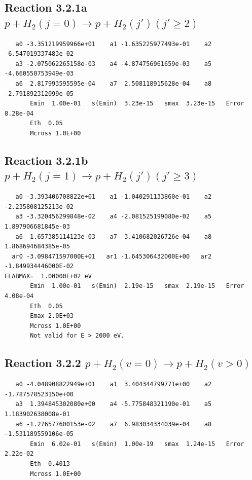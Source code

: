 \documentclass[12pt,dvipdfmx]{article}
\begin{document}
\newpage
\subsection{
Reaction 3.2.1a $   p + H_2(j=0) \rightarrow p + H_2(j')   (j' \geq 2)$}


\begin{small}\begin{verbatim}
   a0 -3.351219959966e+01    a1 -1.635225977493e-01    a2 -6.547019337483e-02
   a3 -2.075062265158e-03    a4 -4.874756961659e-03    a5 -4.660550753949e-03
   a6  2.817993595595e-04    a7  2.508118915628e-04    a8 -2.791892312099e-05
       Emin  1.00e-01   s(Emin)  3.23e-15   smax  3.23e-15   Error  8.28e-04
       Eth  0.05
       Mcross 1.0E+00
\end{verbatim}\end{small}







\newpage
\subsection{
Reaction 3.2.1b $   p + H_2(j=1) \rightarrow p + H_2(j')   (j' \geq 3)$}


\begin{small}\begin{verbatim}
   a0 -3.393406708822e+01    a1 -1.040291133860e-01    a2 -2.235808125213e-02
   a3 -3.320456299848e-02    a4 -2.081525199080e-02    a5  1.897906681845e-03
   a6  1.657385114123e-03    a7 -3.410682026726e-04    a8  1.868694684385e-05
  ar0 -3.098471597000E+01   ar1 -1.645306432000E+00   ar2 -1.849934446000E-02
ELABMAX=  1.00000E+02 eV
       Emin  1.00e-01   s(Emin)  2.19e-15   smax  2.19e-15   Error  4.08e-04
       Eth  0.05
       Emax 2.0E+03
       Mcross 1.0E+00
       Not valid for E > 2000 eV.
\end{verbatim}\end{small}


\newpage
\subsection{
Reaction 3.2.2 $   p + H_2(v=0) \rightarrow p + H_2(v > 0)$}


\begin{small}\begin{verbatim}
   a0 -4.048908822949e+01    a1  3.404344799771e+00    a2 -1.787578523150e+00
   a3  1.394845302080e+00    a4 -5.775848321190e-01    a5  1.183902638008e-01
   a6 -1.276577600153e-02    a7  6.983034334039e-04    a8 -1.531189559106e-05
       Emin  6.02e-01   s(Emin)  1.00e-19   smax  1.24e-15   Error  2.22e-02
       Eth  0.4013
       Mcross 1.0E+00
\end{verbatim}\end{small}
\end{document}
